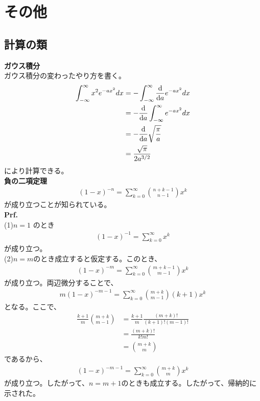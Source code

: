\documentclass[a4paper,11pt]{jsarticle}
\numberwithin{equation}{section}
\begin{document}
\section{その他}
\subsection{計算の類}
\textbf{ガウス積分}\\
ガウス積分の変わったやり方を書く。\\
\begin{align}
  \int_{-\infty}^{\infty} x^2 e^{-ax^2} dx
  &=-\int_{-\infty}^{\infty} \dv{a} e^{-ax^2} dx\\
  &=-\dv{a} \int_{-\infty}^{\infty} e^{-ax^2} dx\\
  &=-\dv{a} \sqrt{\frac{\pi}{a}}\\
  &=\frac{\sqrt{\pi}}{2a^{3/2}}
\end{align}
により計算できる。\\

\textbf{負の二項定理}
\begin{align}
  (1-x)^{-n} = \sum_{k=0}^{\infty} \binom{n+k-1}{n-1} x^k
\end{align}
が成り立つことが知られている。\\
\textbf{Prf.}\\
(1)$n=1$ のとき\\
\begin{align}
  (1-x)^{-1} = \sum_{k=0}^{\infty} x^k
\end{align}
が成り立つ。\\
(2)$n=m$のとき成立すると仮定する。このとき、
\begin{align}
  (1-x)^{-m} = \sum_{k=0}^{\infty} \binom{m+k-1}{m-1} x^k
\end{align}
が成り立つ。両辺微分することで、
\begin{align}
  m(1-x)^{-m-1} = \sum_{k=0}^{\infty} \binom{m+k}{m-1} (k+1) x^k
\end{align}
となる。ここで、
\begin{align}
  \frac{k+1}{m} \binom{m+k}{m-1} &= \frac{k+1}{m} \frac{(m+k)!}{(k+1)!(m-1)!}\\
  &= \frac{(m+k)!}{k!m!}\\
  &= \binom{m+k}{m}
\end{align}
であるから、
\begin{align}
  (1-x)^{-m-1} = \sum_{k=0}^{\infty} \binom{m+k}{m} x^k
\end{align}
が成り立つ。したがって、$n=m+1$のときも成立する。したがって、帰納的に示された。\hfill\qedsymbol\\
\end{document}
